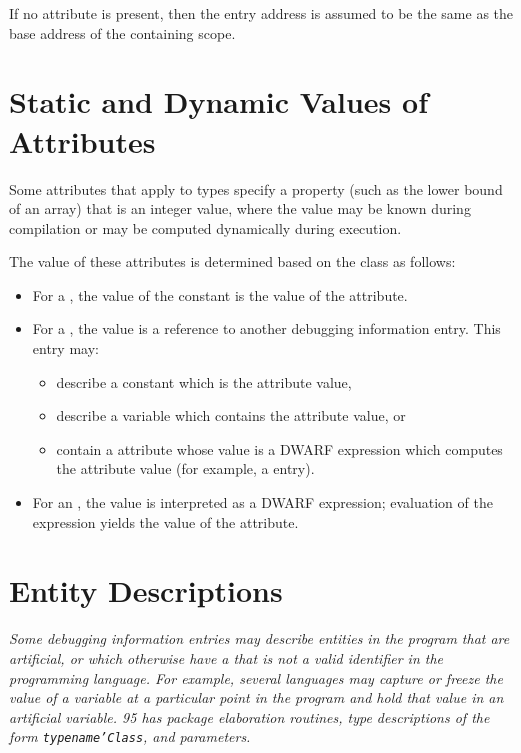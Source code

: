 If \bb\eb no \DWATentrypcNAME{} attribute is present,
then the entry address is assumed to be the same as the
base address of the containing scope.


\section{Static and Dynamic Values of Attributes}
\label{chap:staticanddynamicvaluesofattributes}

Some attributes that apply to types specify a property (such
as the lower bound of an array) that is an integer value,
where the value may be known during compilation or may be
computed dynamically during execution.

The value of these
attributes is determined based on the class as follows:
\begin{itemize}
\item For a , the value 
of the constant is the value of the attribute.

\item For a , the
value is a reference to another 
\bb
debugging information entry.  This entry may:
\eb
\begin{itemize}
\renewcommand{\itemsep}{0cm}
\item describe a constant which is the attribute value,
\item describe a variable which contains the attribute value, or
\item 
\bb
      contain a \DWATlocation{} attribute whose value is a
\eb
      DWARF expression which computes the attribute value
      (for example, \bb\eb a \DWTAGdwarfprocedure{} entry).
\end{itemize}

\item For an , the value 
is interpreted as a DWARF expression; evaluation of the expression 
yields the value of the attribute.
\end{itemize}

\bbpareb

\section{Entity Descriptions}
\textit{Some debugging information entries may describe entities
in the program that are artificial, or which otherwise have a 
 that is not a valid identifier in the
programming language. For example, several languages may
capture or freeze the value of a variable at a particular
point in the program and hold that value in an artificial variable. 
 95 has package elaboration routines,
type descriptions of the form \texttt{typename\textquoteright Class}, and 
 parameters.}

